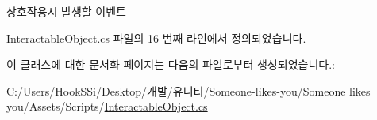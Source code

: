 상호작용시 발생할 이벤트 



Interactable\+Object.\+cs 파일의 16 번째 라인에서 정의되었습니다.



이 클래스에 대한 문서화 페이지는 다음의 파일로부터 생성되었습니다.\+:\begin{DoxyCompactItemize}
\item 
C\+:/\+Users/\+Hook\+S\+Si/\+Desktop/개발/유니티/\+Someone-\/likes-\/you/\+Someone likes you/\+Assets/\+Scripts/\mbox{\hyperlink{_interactable_object_8cs}{Interactable\+Object.\+cs}}\end{DoxyCompactItemize}
